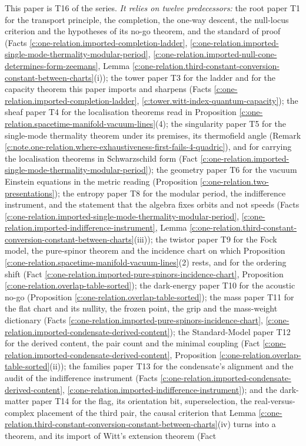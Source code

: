 \documentclass[11pt]{article}
\theoremstyle{definition}
\theoremstyle{plain}
\begin{document}
\label{c:note.one-relation.setting-position-series}
This paper is T16 of the series. \emph{It relies on twelve predecessors:} the root paper T1 \cite{ButlerT1} for the transport principle, the completion, the one-way descent, the null-locus criterion and the hypotheses of its no-go theorem, and the standard of proof (Facts \ref{c:one-relation.imported-completion-ladder}, \ref{c:one-relation.imported-single-mode-thermality-modular-period}, \ref{c:one-relation.imported-null-cone-determines-form-zeemans}, Lemma \ref{c:one-relation.third-constant-conversion-constant-between-charts}(i)); the tower paper T3 \cite{ButlerT3} for the ladder and for the capacity theorem this paper imports and sharpens (Facts \ref{c:one-relation.imported-completion-ladder}, \ref{c:tower.witt-index-quantum-capacity}); the sheaf paper T4 \cite{ButlerT4} for the localisation theorems read in Proposition \ref{c:one-relation.spacetime-manifold-vacuum-lines}(4); the singularity paper T5 \cite{ButlerT5} for the single-mode thermality theorem under its premises, its thermofield angle (Remark \ref{c:note.one-relation.where-exhaustiveness-first-fails-4-quadric}), and for carrying the localisation theorems in Schwarzschild form (Fact \ref{c:one-relation.imported-single-mode-thermality-modular-period}); the geometry paper T6 \cite{ButlerT6} for the vacuum Einstein equations in the metric reading (Proposition \ref{c:one-relation.two-presentations}); the entropy paper T8 \cite{ButlerT8} for the modular period, the indifference instrument, and the statement that the algebra fixes orbits and not speeds (Facts \ref{c:one-relation.imported-single-mode-thermality-modular-period}, \ref{c:one-relation.imported-indifference-instrument}, Lemma \ref{c:one-relation.third-constant-conversion-constant-between-charts}(iii)); the twistor paper T9 \cite{ButlerT9} for the Fock model, the pure-spinor theorem and the incidence chart on which Proposition \ref{c:one-relation.spacetime-manifold-vacuum-lines}(2) rests, and for the ordering shift (Fact \ref{c:one-relation.imported-pure-spinors-incidence-chart}, Proposition \ref{c:one-relation.overlap-table-sorted}); the dark-energy paper T10 \cite{ButlerT10} for the acoustic no-go (Proposition \ref{c:one-relation.overlap-table-sorted}); the mass paper T11 \cite{ButlerT11} for the flat chart and its nullity, the frozen point, the grip and the mass-weight dictionary (Facts \ref{c:one-relation.imported-pure-spinors-incidence-chart}, \ref{c:one-relation.imported-condensate-derived-content}); the Standard-Model paper T12 \cite{ButlerT12} for the derived content, the pair count and the minimal coupling (Fact \ref{c:one-relation.imported-condensate-derived-content}, Proposition \ref{c:one-relation.overlap-table-sorted}(ii)); the families paper T13 \cite{ButlerT13} for the condensate's alignment and the audit of the indifference instrument (Facts \ref{c:one-relation.imported-condensate-derived-content}, \ref{c:one-relation.imported-indifference-instrument}); and the dark-matter paper T14 \cite{ButlerT14} for the flag, its orientation bit, superselection, the real-versus-complex placement of the third pair, the causal criterion that Lemma \ref{c:one-relation.third-constant-conversion-constant-between-charts}(iv) turns into a theorem, and its import of Witt's extension theorem (Fact 
\end{document}
